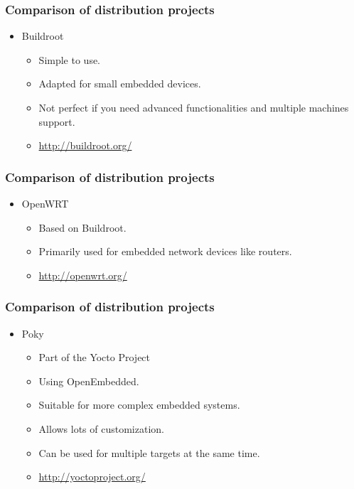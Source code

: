 \begin{frame}
  \frametitle{Comparison of distribution projects}
  \begin{itemize}
  \item Buildroot
    \begin{itemize}
      \item Simple to use.
      \item Adapted for small embedded devices.
      \item Not perfect if you need advanced functionalities and
            multiple machines support.
      \item \url{http://buildroot.org/}
    \end{itemize}
  \end{itemize}
\end{frame}

\begin{frame}
  \frametitle{Comparison of distribution projects}
  \begin{itemize}
  \item OpenWRT
    \begin{itemize}
      \item Based on Buildroot.
      \item Primarily used for embedded network devices like routers.
      \item \url{http://openwrt.org/}
    \end{itemize}
  \end{itemize}
\end{frame}

\begin{frame}
  \frametitle{Comparison of distribution projects}
  \begin{itemize}
  \item Poky
    \begin{itemize}
      \item Part of the Yocto Project
      \item Using OpenEmbedded.
      \item Suitable for more complex embedded systems.
      \item Allows lots of customization.
      \item Can be used for multiple targets at the same time.
      \item \url{http://yoctoproject.org/}
    \end{itemize}
  \end{itemize}
\end{frame}

